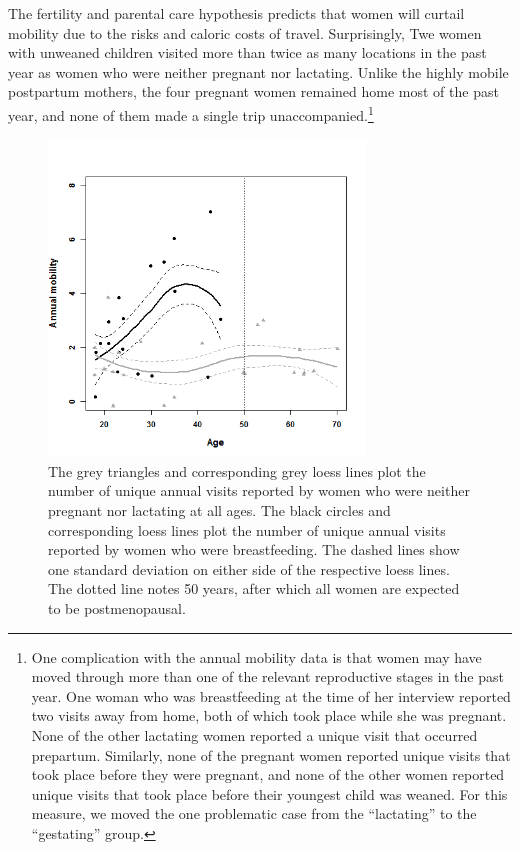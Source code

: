 The fertility and parental care hypothesis predicts that women will curtail mobility due to the risks and caloric costs of travel.  Surprisingly, Twe women with unweaned children visited more than twice as many locations in the past year as women who were neither pregnant nor lactating.  Unlike the highly mobile postpartum mothers, the four pregnant women remained home most of the past year, and none of them made a single trip unaccompanied.\footnote{One complication with the annual mobility data is that women may have moved through more than one of the relevant reproductive stages in the past year. One woman who was breastfeeding at the time of her interview reported two visits away from home, both of which took place while she was pregnant.  None of the other lactating women reported a unique visit that occurred prepartum.  Similarly, none of the pregnant women reported unique visits that took place before they were pregnant, and none of the other women reported unique visits that took place before their youngest child was weaned.  For this measure, we moved the one problematic case from the ``lactating'' to the ``gestating'' group.}


\begin{figure}[!htb]
  \includegraphics[width=0.75\textwidth]{lactmob}
\caption{The grey triangles and corresponding grey loess lines plot the number of unique annual visits reported by women who were neither pregnant nor lactating at all ages.  The black circles and corresponding loess lines plot the number of unique annual visits reported by women who were breastfeeding.  The dashed lines show one standard deviation on either side of the respective loess lines.  The dotted line notes 50 years, after which all women are expected to be postmenopausal.}
\label{fig:lactmob}       %
\end{figure}


